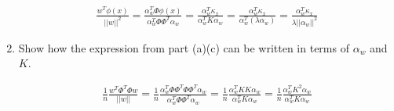 \begin{Parts}
\begin{enumerate}
    \begin{solution}
    \begin{align*}
        \frac{w^T\phi(x)}{||w||^2} = \frac{\alpha_{w}^T\Phi\phi(x)}{\alpha_{w}^T\Phi\Phi^T\alpha_w} =
        \frac{\alpha_{w}^T\kappa_x}{\alpha_{w}^TK\alpha_w} =
        \frac{\alpha_{w}^T\kappa_x}{\alpha_{w}^T\left(\lambda\alpha_w\right)} =
        \frac{\alpha_{w}^T\kappa_x}{\lambda||\alpha_w||^2}
    \end{align*}
\end{solution}
    
    \item Show how the expression from part (a)(c) can be written in terms of $\alpha_w$ and $K$.
    
    \begin{solution}
    \begin{align*}
        \frac{1}{n} \frac{w^T\Phi^T\Phi{}w}{||w||} =
        \frac{1}{n} \frac{\alpha_{w}^T\Phi\Phi^T\Phi\Phi^T\alpha_w}{\alpha_{w}^T\Phi\Phi^T\alpha_w} =
        \frac{1}{n} \frac{\alpha_{w}^TKK\alpha_w}{\alpha_{w}^TK\alpha_w} =
        \frac{1}{n} \frac{\alpha_{w}^TK^2\alpha_w}{\alpha_{w}^TK\alpha_w}
    \end{align*}
\end{solution}
\end{enumerate}

\end{Parts}


